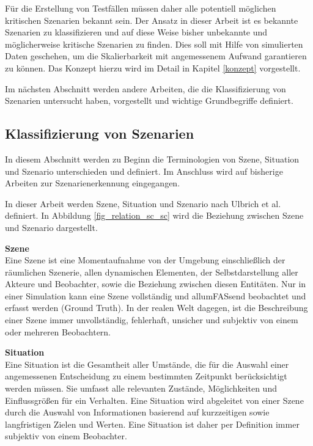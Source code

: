 Für die Erstellung von Testfällen müssen daher alle potentiell möglichen kritischen Szenarien bekannt sein. Der Ansatz in dieser Arbeit ist es bekannte Szenarien zu klassifizieren und auf diese Weise bisher unbekannte und möglicherweise kritische Szenarien zu finden. Dies soll mit Hilfe von simulierten Daten geschehen, um die Skalierbarkeit mit angemessenem Aufwand garantieren zu können. Das Konzept hierzu wird im Detail in Kapitel \ref{konzept} vorgestellt.

 Im nächsten Abschnitt werden andere Arbeiten, die die Klassifizierung von Szenarien untersucht haben, vorgestellt und wichtige Grundbegriffe definiert.


\subsection{Klassifizierung von Szenarien}
\label{grundlagen_fahren_szenarien}

In diesem Abschnitt werden zu Beginn die Terminologien von Szene, Situation und Szenario unterschieden und definiert. Im Anschluss wird auf bisherige Arbeiten zur Szenarienerkennung eingegangen.

In dieser Arbeit werden Szene, Situation und Szenario nach Ulbrich et al. \cite{ulbrich2015defining} definiert. In Abbildung \ref{fig_relation_sc_sc} wird die Beziehung zwischen Szene und Szenario dargestellt.

\noindent\textbf{Szene}\\
Eine Szene ist eine Momentaufnahme von der Umgebung einschließlich der räumlichen Szenerie,  allen dynamischen Elementen, der Selbstdarstellung aller Akteure und Beobachter, sowie die Beziehung zwischen diesen Entitäten. Nur in einer Simulation kann eine Szene vollständig und allumFASsend beobachtet und erfasst werden (Ground Truth). In der realen Welt dagegen, ist die Beschreibung einer Szene immer unvollständig, fehlerhaft, unsicher und subjektiv von einem oder mehreren Beobachtern.

\noindent\textbf{Situation}\\
Eine Situation ist die Gesamtheit aller Umstände, die für die Auswahl einer angemessenen Entscheidung zu einem bestimmten Zeitpunkt berücksichtigt werden müssen. Sie umfasst alle relevanten Zustände, Möglichkeiten und Einflussgrößen für ein Verhalten. Eine Situation wird abgeleitet von einer Szene durch die Auswahl von Informationen basierend auf kurzzeitigen sowie langfristigen Zielen und Werten. Eine Situation ist daher per Definition immer subjektiv von einem Beobachter.

